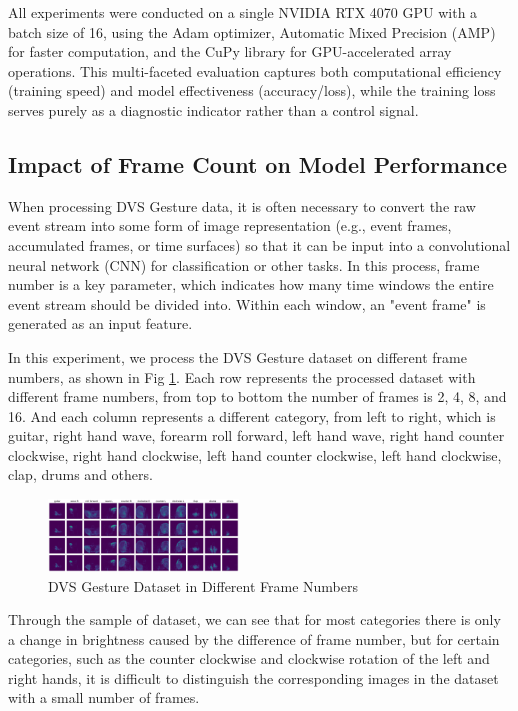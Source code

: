 \documentclass[conference]{IEEEtran}
\begin{document}
All experiments were conducted on a single NVIDIA RTX 4070 GPU with a batch size of 16, using the Adam optimizer, 
Automatic Mixed Precision (AMP) for faster computation, and the CuPy library for GPU-accelerated array operations. 
This multi-faceted evaluation captures both computational efficiency (training speed) and model effectiveness (accuracy/loss), 
while the training loss serves purely as a diagnostic indicator rather than a control signal.

\subsection{Impact of Frame Count on Model Performance}
When processing DVS Gesture data, it is often necessary to convert the raw event stream into some form of 
image representation (e.g., event frames, accumulated frames, or time surfaces) so that it can be input into a 
convolutional neural network (CNN) for classification or other tasks. In this process, frame number is a key parameter, 
which indicates how many time windows the entire event stream should be divided into. 
Within each window, an "event frame" is generated as an input feature.

In this experiment, we process the DVS Gesture dataset on different frame numbers, as shown in Fig \ref{fig:dvs_gesture_frame_num}.
Each row represents the processed dataset with different frame numbers, from top to bottom the number of frames is 2, 4, 8, and 16.
And each column represents a different category, from left to right, which is guitar, right hand wave, forearm roll forward, left hand wave, 
right hand counter clockwise, right hand clockwise, left hand counter clockwise, left hand clockwise, clap, drums and others.
\begin{figure}
    \centering
    \includegraphics[width=0.45\textwidth]{figure/dataset.png}
    \caption{DVS Gesture Dataset in Different Frame Numbers}
    \label{fig:dvs_gesture_frame_num}
\end{figure}

Through the sample of dataset, we can see that for most categories there is only a change in brightness caused by the difference of frame number, 
but for certain categories, such as the counter clockwise and clockwise rotation of the left and right hands, 
it is difficult to distinguish the corresponding images in the dataset with a small number of frames.
\end{document}
